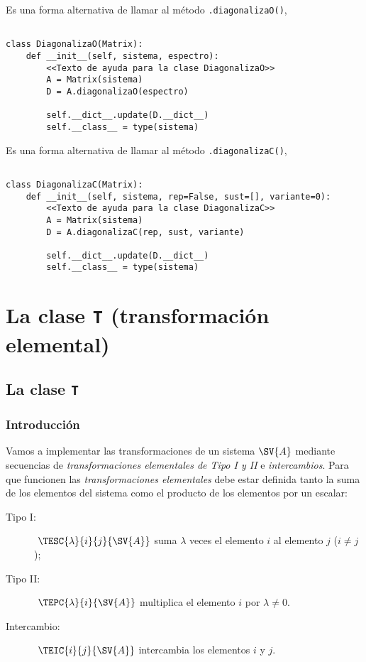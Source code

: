\documentclass[11pt]{report}
\begin{document}
Es una forma alternativa de llamar al método \texttt{.diagonalizaO()},
\begin{verbatim}

class DiagonalizaO(Matrix):
    def __init__(self, sistema, espectro):
        <<Texto de ayuda para la clase DiagonalizaO>>
        A = Matrix(sistema)
        D = A.diagonalizaO(espectro)
            
        self.__dict__.update(D.__dict__)
        self.__class__ = type(sistema)

\end{verbatim}

Es una forma alternativa de llamar al método \texttt{.diagonalizaC()},
\begin{verbatim}

class DiagonalizaC(Matrix):
    def __init__(self, sistema, rep=False, sust=[], variante=0):
        <<Texto de ayuda para la clase DiagonalizaC>>
        A = Matrix(sistema)
        D = A.diagonalizaC(rep, sust, variante)
            
        self.__dict__.update(D.__dict__)
        self.__class__ = type(sistema)

\end{verbatim}




\part{La clase \texttt{T} (transformación elemental)}
\label{sec:orge704812}

\chapter{La clase \texttt{T}}
\label{sec:orge9fb5b8}

\section{Introducción}
\label{sec:orgfd34981}

Vamos a implementar las transformaciones de un sistema \(\SV{A}\)
mediante secuencias de \emph{transformaciones elementales de Tipo I y II} e
\emph{intercambios}. Para que funcionen las \emph{transformaciones elementales}
debe estar definida tanto la suma de los elementos del sistema como el
producto de los elementos por un escalar:

\begin{description}
\item[{Tipo I:}] \(~\TESC{\lambda}{i}{j}{\SV{A}}\) suma \(\lambda\) veces el
elemento \(i\) al elemento \(j\) (\(i\ne j\));
\item[{Tipo II:}] \(~\TEPC{\lambda}{i}{\SV{A}}\) multiplica el elemento \(i\) por
\(\lambda\ne0\).
\item[{Intercambio:}] \(~\TEIC{i}{j}{\SV{A}}\) intercambia los elementos \(i\) y
\(j\).
\end{description}
\end{document}
